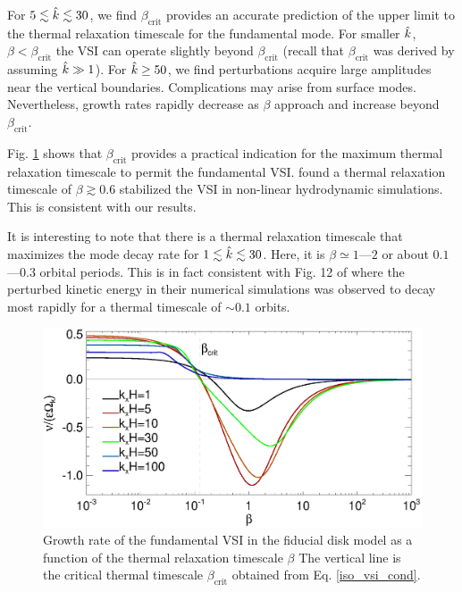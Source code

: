 For $5\lesssim\hat{k}\lesssim30$, we find $\beta_\mathrm{crit}$ provides
an accurate prediction of the upper limit to the thermal relaxation 
timescale for the fundamental mode. For smaller $\hat{k}$, 
$\beta<\beta_\mathrm{crit}$ the VSI can operate slightly beyond
$\beta_\mathrm{crit}$ (recall that $\beta_\mathrm{crit}$ was derived
by assuming $\hat{k}\gg 1$). For $\hat{k}\geq 50$, we find perturbations
acquire large amplitudes near the vertical boundaries. Complications
may arise from surface modes. Nevertheless, growth rates rapidly
decrease as $\beta$ approach and increase beyond
$\beta_\mathrm{crit}$.  

Fig. \ref{bcrit_compare1} shows that $\beta_\mathrm{crit}$ provides a  
practical indication for the maximum thermal relaxation timescale to
permit the fundamental VSI. %
\cite{nelson13} found a thermal relaxation timescale of $\beta\gtrsim
0.6$ stabilized the VSI in non-linear hydrodynamic simulations. This 
is consistent with our results.   

It is interesting to note that there is a thermal relaxation timescale that
maximizes the mode decay rate for $1\lesssim \hat{k} \lesssim 30$. Here,
it is $\beta\simeq1$---$2$ or about $0.1$---$0.3$ orbital
periods. This is in fact consistent with Fig. 12 of \cite{nelson13}
where the perturbed kinetic energy in their numerical simulations was
observed to decay most rapidly for a thermal timescale of $\sim 0.1$
orbits.     


\begin{figure}
   \includegraphics[width=\linewidth]{figures/gcorr_compare2} 
   \caption{Growth rate of the fundamental VSI in the fiducial disk
     model as a function of the thermal relaxation timescale $\beta$
     The vertical line
     is the critical thermal timescale $\beta_\mathrm{crit}$  obtained
     from Eq. \ref{iso_vsi_cond}. 
     \label{bcrit_compare1}}   
 \end{figure} 


